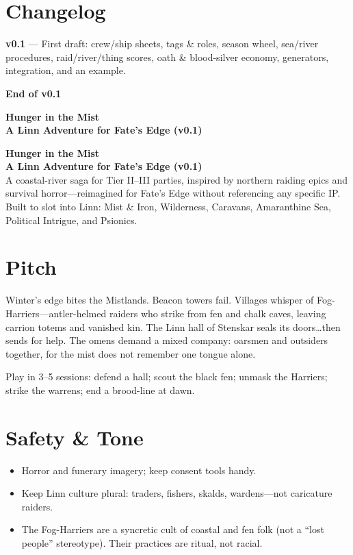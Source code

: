 \documentclass[11pt]{article}
\begin{document}
\section{Changelog}

\textbf{v0.1} --- First draft: crew/ship sheets, tags \& roles, season wheel, sea/river procedures, raid/river/thing scores, oath \& blood-silver economy, generators, integration, and an example.

\textbf{End of v0.1}
\clearpage

\textbf{Hunger in the Mist \\ \large A Linn Adventure for Fate's Edge (v0.1)}

\begin{center}
    \textbf{Hunger in the Mist \\ \large A Linn Adventure for Fate's Edge (v0.1)} \\
    A coastal-river saga for Tier II--III parties, inspired by northern raiding epics and survival horror---reimagined for Fate's Edge without referencing any specific IP. Built to slot into Linn: Mist \& Iron, Wilderness, Caravans, Amaranthine Sea, Political Intrigue, and Psionics.
\end{center}

\section*{Pitch}

Winter's edge bites the Mistlands. Beacon towers fail. Villages whisper of Fog-Harriers---antler-helmed raiders who strike from fen and chalk caves, leaving carrion totems and vanished kin. The Linn hall of Stenskar seals its doors\dots then sends for help. The omens demand a mixed company: oarsmen and outsiders together, for the mist does not remember one tongue alone.

Play in 3--5 sessions: defend a hall; scout the black fen; unmask the Harriers; strike the warrens; end a brood-line at dawn.

\section*{Safety \& Tone}
\begin{itemize}
\item Horror and funerary imagery; keep consent tools handy.
\item Keep Linn culture plural: traders, fishers, skalds, wardens---not caricature raiders.
\item The Fog-Harriers are a syncretic cult of coastal and fen folk (not a ``lost people'' stereotype). Their practices are ritual, not racial.
\end{itemize}
\end{document}
